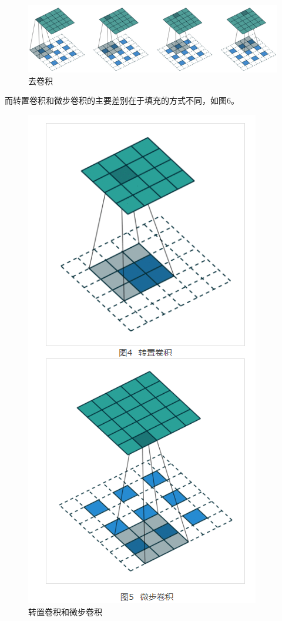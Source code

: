 \documentclass[
  hyperref, a4paper]{ctexart}
\begin{document}
\begin{figure}
\centering
\includegraphics{./5.png}
\caption{去卷积}
\end{figure}

而转置卷积和微步卷积的主要差别在于填充的方式不同，如图6。

\begin{figure}
\centering
\includegraphics{./6.png}
\caption{转置卷积和微步卷积}
\end{figure}
\end{document}
